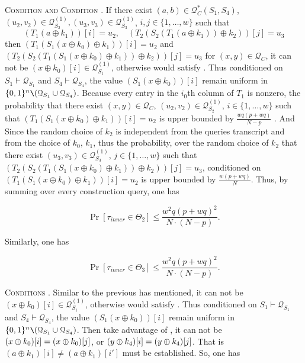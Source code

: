 \noindent \textsc{Condition \ctwo and Condition \cthree}. If there exist $(a, b) \in \mathcal{Q}_{C}^{*}\left(S_{1}, S_{4}\right)$, $(u_{2},v_{2}) \in \mathcal{Q}_{S_{2}}^{(1)}, (u_{3}, v_{3}) \in \mathcal{Q}_{S_{3}}^{(1)}$, $i, j \in\{1, \ldots, w\}$ such that 
$$\left(T_1\left(a \oplus k_{1}\right)\right)[i] = u_2,  \quad \left(T_{2}\left(S_{2}\left(T_1\left(a \oplus k_{1}\right)\right) \oplus k_{2}\right)\right)[j] = u_3$$
 \noindent then $\left(T_{1}\left(S_{1}\left(x \oplus k_{0}\right) \oplus k_{1}\right)\right)[i]=u_2$ and $\left(T_{2}\left(S_{2}\left(T_{1}\left(S_{1}\left(x \oplus k_{0}\right) \oplus k_{1}\right)\right) \oplus k_{2}\right)\right)[j]=u_{3}$ for $(x, y) \in \mathcal{Q}_{C}$, it can not be $\left(x \oplus k_{0}\right)[i] \in \mathcal{Q}_{S_{1}}^{(1)}$, otherwise would satisfy \btwo. Thus conditioned on $S_{1} \vdash \mathcal{Q}_{S_{1}}$ and $S_{4} \vdash \mathcal{Q}_{S_{4}}$, the value $\left(S_{1}\left(x \oplus k_{0}\right)\right)[i]$ remain uniform in $\{0, 1\}^{n} \verb|\| (\mathcal{Q}_{S_{1}} \cup \mathcal{Q}_{S_{4}})$. Because every entry in the $i_{0}$th column of $T_{1}$ is nonzero, the probability that there exist $(x, y) \in \mathcal{Q}_{C}$, $(u_{2}, v_{2}) \in \mathcal{Q}_{S_{2}}^{(1)}$, $i \in\{1, \ldots, w\}$ such that $\left(T_{1}\left(S_{1}\left(x \oplus k_{0}\right) \oplus k_{1}\right)\right)[i]=u_2$ is upper bounded by $\frac{w q (p+w q)}{N-p}$ . And Since the random choice of $k_{2}$ is independent from the queries transcript and from the choice of $k_{0}$, $k_{1}$, thus the probability, over the random choice of $k_{2}$ that there exist $(u_{3}, v_{3}) \in \mathcal{Q}_{S_{3}}^{(1)}$, $j \in\{1, \ldots, w\}$ such that $\left(T_{2}\left(S_{2}\left(T_{1}\left(S_{1}\left(x \oplus k_{0}\right) \oplus k_{1}\right)\right) \oplus k_{2}\right)\right)[j]=u_{3}$, conditioned on $\left(T_{1}\left(S_{1}\left(x \oplus k_{0}\right) \oplus k_{1}\right)\right)[i]=u_2$ is upper bounded by $\frac{w (p+w q)}{N}$. Thus, by summing over every construction query, one has

$$
\operatorname{Pr}\left[\tau_{inner} \in \Theta_{2}\right] \leq \frac{w^{2} q (p+w q)^{2}}{N \cdot (N-p)}.
$$

\noindent Similarly, one has

$$
\operatorname{Pr}\left[\tau_{inner} \in \Theta_{3}\right] \leq \frac{w^{2} q (p+w q)^{2}}{N \cdot (N-p)}.
$$

\noindent \textsc{Conditions \cfour}. Similar to the previous has mentioned, it can not be $\left(x \oplus k_{0}\right)[i] \in \mathcal{Q}_{S_{1}}^{(1)}$, otherwise would satisfy \btwo. Thus conditioned on $S_{1} \vdash \mathcal{Q}_{S_{1}}$ and $S_{4} \vdash \mathcal{Q}_{S_{4}}$, the value $\left(S_{1}\left(x \oplus k_{0}\right)\right)[i]$ remain uniform in $\{0, 1\}^{n} \verb|\| (\mathcal{Q}_{S_{1}} \cup \mathcal{Q}_{S_{4}})$. Then take advantage of \bfour, it can not be $(x\oplus k_0)[i]=(x\oplus k_0)[j]$, or $(y\oplus k_4)[i]=(y\oplus k_4)[j]$. That is $\left(a \oplus k_{1}\right)[i] \neq \left(a \oplus k_{1}\right)[i']$ must be established. So, one has

